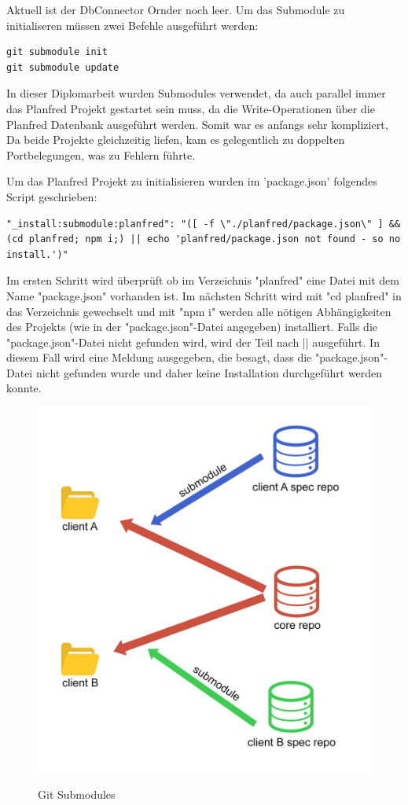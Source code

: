 Aktuell ist der DbConnector Ornder noch leer. Um das Submodule zu initialiseren müssen zwei Befehle ausgeführt werden:

\begin{lstlisting}
git submodule init
git submodule update
\end{lstlisting}

In dieser Diplomarbeit wurden Submodules verwendet, da auch parallel immer das Planfred Projekt gestartet sein muss, da die Write-Operationen über die Planfred Datenbank ausgeführt werden. Somit war es anfangs sehr kompliziert, Da beide Projekte gleichzeitig liefen, kam es gelegentlich zu doppelten Portbelegungen, was zu Fehlern führte.

Um das Planfred Projekt zu initialisieren wurden im 'package.json' folgendes Script geschrieben:

\begin{lstlisting}
"_install:submodule:planfred": "([ -f \"./planfred/package.json\" ] && (cd planfred; npm i;) || echo 'planfred/package.json not found - so no install.')"
\end{lstlisting}

Im ersten Schritt wird überprüft ob im Verzeichnis "planfred" eine Datei mit dem Name "package.json" vorhanden ist. Im nächsten Schritt wird mit "cd planfred" in das Verzeichnis gewechselt und mit "npm i" werden alle nötigen Abhängigkeiten des Projekts (wie in der "package.json"-Datei angegeben) installiert. Falls die "package.json"-Datei nicht gefunden wird, wird der Teil nach || ausgeführt. In diesem Fall wird eine Meldung ausgegeben, die besagt, dass die "package.json"-Datei nicht gefunden wurde und daher keine Installation durchgeführt werden konnte. 
\cite{git_sub_modules}

\begin{figure}[h!]
    \centering
    \includegraphics[width=0.6\linewidth]{pics/git-submodules.jpg}
    \caption{Git Submodules}
    \label{fig:enter-label}
    \cite{subomdules_grafik}
\end{figure}



